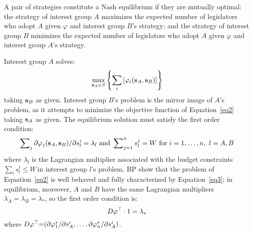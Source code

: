 \documentclass[nojss]{jss}
\begin{document}
A pair of strategies constitute a Nash equilibrium if they are mutually
optimal: the strategy of interest group $A$ maximizes the expected
number of legislators who adopt $A$ given $\varphi$ and interest
group $B$'s strategy; and the strategy of interest group $B$
minimizes the expected number of legislators who adopt $A$ given
$\varphi$ and interest group $A$'s strategy.

Interest group $A$ solves:
%
\begin{equation}
\max_{{\bf s}_{A}\in S}\left\{ \sum_{i}\left[ \varphi _{i}({\bf s}_{A},{\bf s%
}_{B})\right] \right\}  \label{eq2}
\end{equation}%
%
taking ${\bf s}_{B}$ as given. Interest group $B$'s problem is the
mirror image of $A$'s problem, as it attempts to minimize the objective
function of Equation~\ref{eq2} taking ${\bf s}_{A}$ as given. The equilibrium
solution must satisfy the first order condition:
%
\begin{equation}
\sum\nolimits_{j}\partial \varphi _{j}({\bf s}_{A},{\bf s}_{B})/\partial
s_{l}^{i}=\lambda _{l}\text{ and }\sum\nolimits_{j=1}^{n}s_{l}^{j}=W\text{
for }i=1,\dots,n,\text{ }l=A,B  \label{eq3}
\end{equation}
%
where $\lambda_{l}$ is the Lagrangian multiplier associated with the budget
constraints $\sum\nolimits_{i}s_{l}^{i}\leq W\,$in interest group $l$'s
problem.  BP show that the problem of Equation~\ref{eq2} is well behaved and fully
characterized by Equation~\ref{eq3}; in equilibrium, moreover, $A$ and $B$ have the
same Lagrangian multipliers $\lambda_{A}=\lambda _{B}=\lambda _{\ast}$, so
the first order condition is:
%
\[
D{\bf \varphi }^{\top}\cdot 1=\lambda _{\ast } 
\]%
%
where $D{\bf \varphi }^{\top}{\bf =}(\partial \varphi _{1}^{\ast }/\partial
s_{A}^{i},\dots,\partial \varphi _{n}^{\ast }/\partial s_{A}^{i})$.
\end{document}
